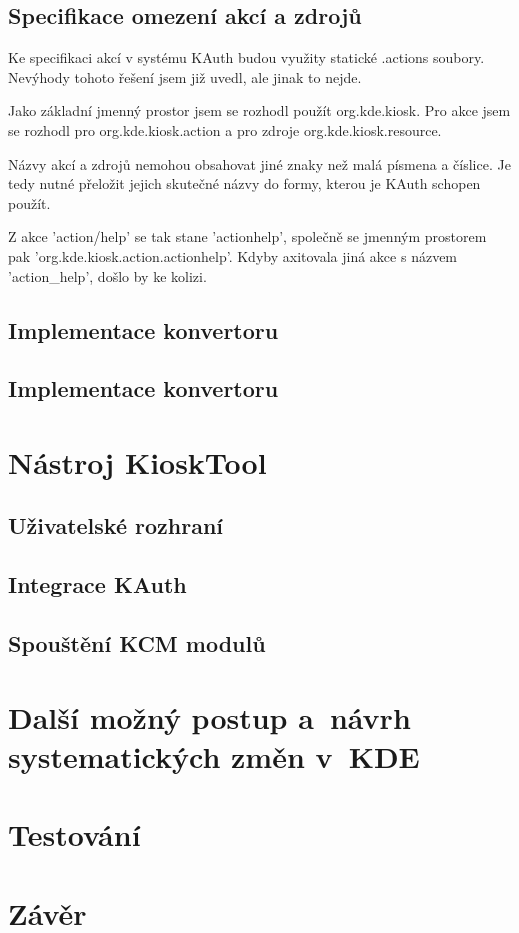 \section{Specifikace omezení akcí a zdrojů}
Ke specifikaci akcí v systému KAuth budou využity statické .actions soubory.
Nevýhody tohoto řešení jsem již uvedl, ale jinak to nejde.

Jako základní jmenný prostor jsem se rozhodl použít org.kde.kiosk. Pro akce jsem
se rozhodl pro org.kde.kiosk.action a pro zdroje org.kde.kiosk.resource.

Názvy akcí a zdrojů nemohou obsahovat jiné znaky než malá písmena a číslice. Je
tedy nutné přeložit jejich skutečné názvy do formy, kterou je KAuth schopen
použít.

Z akce 'action/help' se tak stane 'actionhelp', společně se jmenným prostorem
pak 'org.kde.kiosk.action.actionhelp'. Kdyby axitovala jiná akce s názvem 
'action\_help', došlo by ke kolizi.



\section{Implementace konvertoru}

\section{Implementace konvertoru}


\chapter{Nástroj KioskTool}

\section{Uživatelské rozhraní}
\section{Integrace KAuth}
\section{Spouštění KCM modulů}
\chapter{Další možný postup a~návrh systematických změn v~KDE}
\chapter{Testování}
\chapter{Závěr}
\cite{fitWeb}
